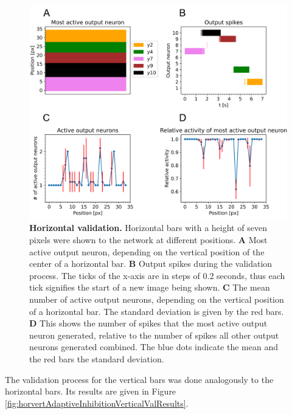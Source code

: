 \begin{figure}
  \includegraphics[width=\linewidth]{figures/horvertAdaptiveInh/horizontal_validation.png}
  \caption{\textbf{Horizontal validation.} Horizontal bars with a height of seven pixels were shown to the network at different positions. \textbf{A} Most active output neuron, depending on the vertical position of the center of a horizontal bar. \textbf{B} Output spikes during the validation process. The ticks of the x-axis are in steps of 0.2 seconds, thus each tick signifies the start of a new image being shown. \textbf{C} The mean number of active output neurons, depending on the vertical position of a horizontal bar. The standard deviation is given by the red bars. \textbf{D} This shows the number of spikes that the most active output neuron generated, relative to the number of spikes all other output neurons generated combined. The blue dots indicate the mean and the red bars the standard deviation. }
  \label{fig:horvertAdaptiveInhibitionHorizontalValResults}
\end{figure}

The validation process for the vertical bars was done analogously to the horizontal bars. Its results are given in Figure \ref{fig:horvertAdaptiveInhibitionVerticalValResults}. 
 
